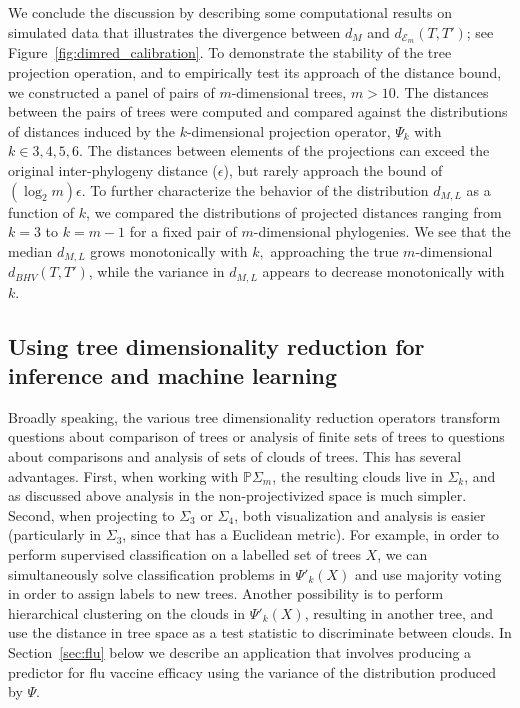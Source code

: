 \documentclass[a4paper,11pt]{article}
\newcommand{\aE}{\mathcal{E}}
\begin{document}
We conclude the discussion by describing some computational results on simulated data that illustrates the divergence between $d_M$ and $d_{\aE_m}(T,T')$; see Figure~\ref{fig:dimred_calibration}.
To demonstrate the stability of the tree projection operation, and to empirically test its approach of the distance bound, we constructed a panel of pairs of $m$-dimensional trees, $m > 10$.
The distances between the pairs of trees were computed and compared against the distributions of distances induced by the $k$-dimensional projection operator, $\Psi_k$ with $k \in {3,4,5,6}$.
The distances between elements of the projections can exceed the original inter-phylogeny distance ($\epsilon$), but rarely approach the bound of $(\log_2 m)\epsilon$.
To further characterize the behavior of the distribution $d_{M,L}$ as a function of $k$, we compared the distributions of projected distances ranging from $k=3$ to $k=m-1$ for a fixed pair of $m$-dimensional phylogenies.
We see that the median $d_{M,L}$ grows monotonically with $k,$ approaching the true $m$-dimensional $d_{BHV}(T, T')$, while the variance in $d_{M,L}$ appears to decrease monotonically with $k$.

\subsection{Using tree dimensionality reduction for inference and machine learning}

Broadly speaking, the various tree dimensionality reduction operators transform questions about comparison of trees or analysis of finite sets of trees to questions about comparisons and analysis of sets of clouds of trees.
This has several advantages.
First, when working with $\mathbb{P}\Sigma_m$, the resulting clouds live in $\Sigma_k$, and as discussed above analysis in the non-projectivized space is much simpler.
Second, when projecting to $\Sigma_3$ or $\Sigma_4$, both visualization and analysis is easier (particularly in $\Sigma_3$, since that has a Euclidean metric).
For example, in order to perform supervised classification on a labelled set of trees $X$, we can simultaneously solve classification problems in $\Psi'_k(X)$ and use majority voting in order to assign labels to new trees.
Another possibility is to perform hierarchical clustering on the clouds in $\Psi'_k(X)$, resulting in another tree, and use the distance in tree space as a test statistic to discriminate between clouds.
In Section~\ref{sec:flu} below we describe an application that involves producing a predictor for flu vaccine efficacy using the variance of the distribution produced by $\Psi$.
\end{document}
